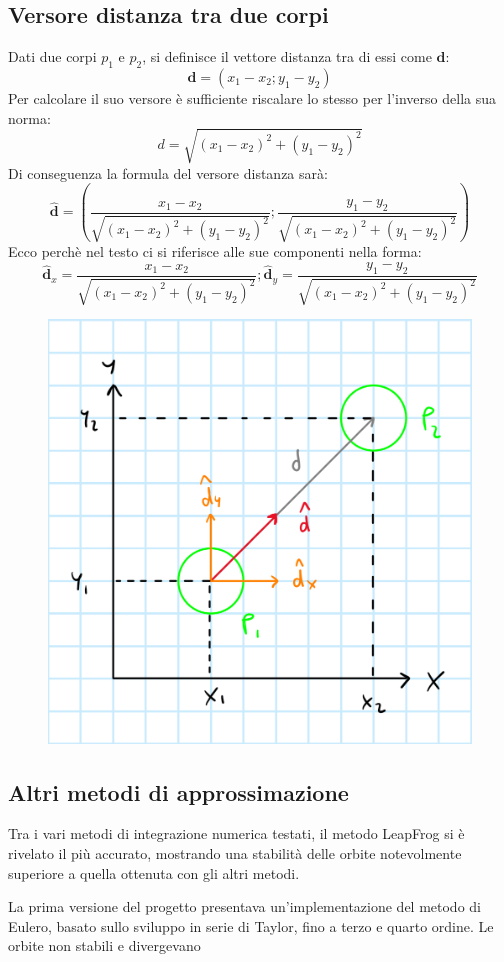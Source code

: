 \documentclass{article}
\begin{document}
\subsection{Versore distanza tra due corpi}
\label{ap1}
Dati due corpi $p_{1}$ e $p_{2}$, si definisce il vettore distanza tra di essi come $\textbf{d}$:
\begin{equation}
    \textbf{d}=(x_{1}-x_{2}; y_{1}-y_{2})
\end{equation}
Per calcolare il suo versore è sufficiente riscalare lo stesso per l'inverso della sua norma:
\begin{equation}
    d=\sqrt{(x_{1}-x_{2})^2+(y_{1}-y_{2})^2}
\end{equation}
Di conseguenza la formula del versore distanza sarà:
\begin{equation}
    \mathbf{\hat{d}}=(\frac{x_{1}-x_{2}}{\sqrt{(x_{1}-x_{2})^2+(y_{1}-y_{2})^2}}; \frac{y_{1}-y_{2}}{\sqrt{(x_{1}-x_{2})^2+(y_{1}-y_{2})^2}})   
\end{equation}
Ecco perchè nel testo ci si riferisce alle sue componenti nella forma:
\begin{equation}
    \mathbf{\hat{d}}_{x}=\frac{x_{1}-x_{2}}{\sqrt{(x_{1}-x_{2})^2+(y_{1}-y_{2})^2}} ; \mathbf{\hat{d}}_{y}=\frac{y_{1}-y_{2}}{\sqrt{(x_{1}-x_{2})^2+(y_{1}-y_{2})^2}}
\end{equation}
\begin{figure}
    \centering
    \includegraphics[height=.20\linewidth]{VersoreDistanza.png}
\end{figure}

\subsection{Altri metodi di approssimazione}
\label{ap2}
Tra i vari metodi di integrazione numerica testati, il metodo LeapFrog si è rivelato il più accurato, mostrando una stabilità delle orbite notevolmente superiore a quella ottenuta con gli altri metodi.

La prima versione del progetto presentava un'implementazione del metodo di Eulero, basato sullo sviluppo in serie di Taylor, fino a terzo e quarto ordine. Le orbite non  stabili e divergevano
\end{document}
